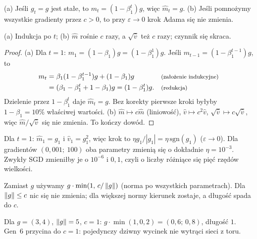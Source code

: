 \begin{twierdzenie}\label{tw:adam}
(a) Jeśli $g_t=g$ jest stałe, to $m_t=(1-\beta_1^t)g$, więc $\hat m_t=g$. (b) Jeśli pomnożymy wszystkie gradienty przez $c>0$, to przy $\varepsilon\to0$ krok Adama się nie zmienia.
\end{twierdzenie}
\begin{pomyslDowodu}
(a) Indukcja po $t$; (b) $\hat m$ rośnie $c$ razy, a $\sqrt{\hat v}$ też $c$ razy; czynnik się skraca.
\end{pomyslDowodu}
\begin{proof}
(a) Dla $t=1$: $m_1=(1-\beta_1)g=(1-\beta_1^1)g$. Jeśli $m_{t-1}=(1-\beta_1^{t-1})g$, to
\begin{align*}
m_t &= \beta_1(1-\beta_1^{t-1})g+(1-\beta_1)g && \text{\footnotesize (założenie indukcyjne)}\\
 &= (\beta_1-\beta_1^t+1-\beta_1)g=(1-\beta_1^t)g. && \text{\footnotesize (redukcja)}
\end{align*}
Dzielenie przez $1-\beta_1^t$ daje $\hat m_t=g$. Bez korekty pierwsze kroki byłyby $1-\beta_1=10\%$ właściwej wartości.
(b) $\hat m\mapsto c\hat m$ (liniowość), $\hat v\mapsto c^2\hat v$, $\sqrt{\hat v}\mapsto c\sqrt{\hat v}$, więc $\hat m/\sqrt{\hat v}$ się nie zmienia. To kończy dowód.
\end{proof}

\begin{przyklad}\label{prz:adam}
Dla $t=1$: $\hat m_1=g_1$ i $\hat v_1=g_1^2$, więc krok to $\eta g_1/|g_1|=\eta\,\mathrm{sgn}(g_1)$ ($\varepsilon\to0$). Dla gradientów $(0{,}001;\ 100)$ oba parametry zmienią się o dokładnie $\eta=10^{-3}$. Zwykły SGD zmieniłby je o $10^{-6}$ i $0{,}1$, czyli o liczby różniące się pięć rzędów wielkości.
\end{przyklad}

\begin{definicja}\label{def:clip-grad}
Zamiast $g$ używamy $g\cdot\min(1,\,c/\left\lVert g\right\rVert)$ (norma po wszystkich parametrach). Dla $\left\lVert g\right\rVert\le c$ nic się nie zmienia; dla większej normy kierunek zostaje, a długość spada do $c$.
\end{definicja}

\begin{przyklad}\label{prz:clip}
Dla $g=(3,4)$, $\left\lVert g\right\rVert=5$, $c=1$: $g\cdot\min(1,0{,}2)=(0{,}6;\,0{,}8)$, długość $1$. Gen~6 przycina do $c=1$: pojedynczy dziwny wycinek nie wytrąci sieci z toru.
\end{przyklad}


